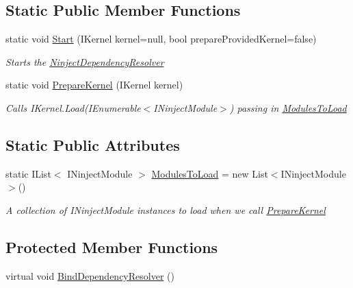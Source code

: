 \subsection*{Static Public Member Functions}
\begin{DoxyCompactItemize}
\item 
static void \hyperlink{classCqrs_1_1Ninject_1_1Configuration_1_1NinjectDependencyResolver_adc6171ed45679dcbaa67782770ba5083}{Start} (I\+Kernel kernel=null, bool prepare\+Provided\+Kernel=false)
\begin{DoxyCompactList}\small\item\em Starts the \hyperlink{classCqrs_1_1Ninject_1_1Configuration_1_1NinjectDependencyResolver}{Ninject\+Dependency\+Resolver} \end{DoxyCompactList}\item 
static void \hyperlink{classCqrs_1_1Ninject_1_1Configuration_1_1NinjectDependencyResolver_a00f928f47792a9945513b239a5b82293}{Prepare\+Kernel} (I\+Kernel kernel)
\begin{DoxyCompactList}\small\item\em Calls I\+Kernel.\+Load(\+I\+Enumerable$<$\+I\+Ninject\+Module$>$) passing in \hyperlink{classCqrs_1_1Ninject_1_1Configuration_1_1NinjectDependencyResolver_a45264a8fae5380727d1af41bc2155381}{Modules\+To\+Load} \end{DoxyCompactList}\end{DoxyCompactItemize}
\subsection*{Static Public Attributes}
\begin{DoxyCompactItemize}
\item 
static I\+List$<$ I\+Ninject\+Module $>$ \hyperlink{classCqrs_1_1Ninject_1_1Configuration_1_1NinjectDependencyResolver_a45264a8fae5380727d1af41bc2155381}{Modules\+To\+Load} = new List$<$I\+Ninject\+Module$>$()
\begin{DoxyCompactList}\small\item\em A collection of I\+Ninject\+Module instances to load when we call \hyperlink{classCqrs_1_1Ninject_1_1Configuration_1_1NinjectDependencyResolver_a00f928f47792a9945513b239a5b82293}{Prepare\+Kernel} \end{DoxyCompactList}\end{DoxyCompactItemize}
\subsection*{Protected Member Functions}
\begin{DoxyCompactItemize}
\item 
virtual void \hyperlink{classCqrs_1_1Ninject_1_1Configuration_1_1NinjectDependencyResolver_a2b663d936fcded5f679623bf0b0393e6}{Bind\+Dependency\+Resolver} ()
\end{DoxyCompactItemize}
